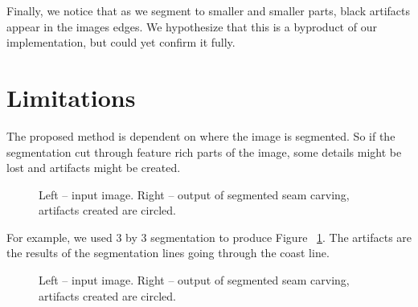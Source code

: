\documentclass[conference]{acmsiggraph}
\begin{document}
Finally, we notice that as we segment to smaller and smaller parts, black artifacts appear in the images edges. We hypothesize that this is a byproduct of our implementation, but could yet confirm it fully.


\section{Limitations}

The proposed method is dependent on where the image is segmented. So if the segmentation cut through feature rich parts of the image, some details might be lost and artifacts might be created. 

\begin{figure}[ht]       
    \caption{Left -- input image. Right -- output of segmented seam carving, artifacts created are circled.}
    \label{fig:Beach_in_and_out}
    
\end{figure}

For example, we used 3 by 3 segmentation to produce Figure ~\ref{fig:Beach_in_and_out}. The artifacts are the results of the segmentation lines going through the coast line.


\begin{figure}[ht]       
    \caption{Left -- input image. Right -- output of segmented seam carving, artifacts created are circled.}
    \label{fig:Beach_lines}
\end{figure}
\end{document}
